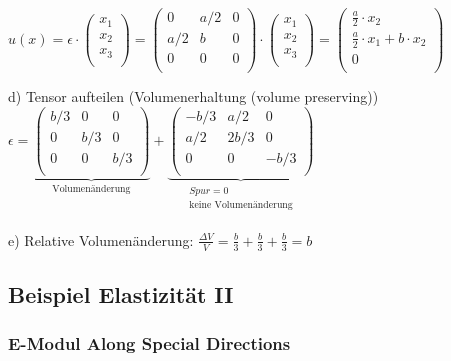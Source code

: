 \documentclass[a4paper]{scrartcl}
\begin{document}
$u(x) = \epsilon \cdot \begin{pmatrix} x_1\\ x_2\\ x_3\\ \end{pmatrix} =
\begin{pmatrix} 0 & a/2 & 0\\
a/2 & b & 0\\
0 & 0 & 0\\
\end{pmatrix} \cdot \begin{pmatrix} x_1\\ x_2\\ x_3\\ \end{pmatrix} =
\begin{pmatrix}
\frac{a}{2} \cdot x_2\\ \frac{a}{2} \cdot x_1 + b \cdot x_2\\ 0\\ \end{pmatrix}$

d) Tensor aufteilen (Volumenerhaltung (volume preserving))\\
$\epsilon =
\underbrace{
\begin{pmatrix}
b/3 & 0 & 0\\
0 & b/3 & 0\\
0 & 0 & b/3\\
\end{pmatrix}
}_{\text{Volumenänderung}} +
\underbrace {
\begin{pmatrix}
-b/3 & a/2 & 0\\
a/2 & 2b/3 & 0\\
0 & 0 & -b/3\\
\end{pmatrix}}_{\begin{matrix} Spur = 0\\ \text{keine Volumenänderung}\\
\end{matrix}}$

e) Relative Volumenänderung: $\frac{\Delta V}{V} = \frac{b}{3} + \frac{b}{3} +
\frac{b}{3} = b$

\subsection{Beispiel Elastizität II}

\subsubsection{E-Modul Along Special Directions}
\end{document}

